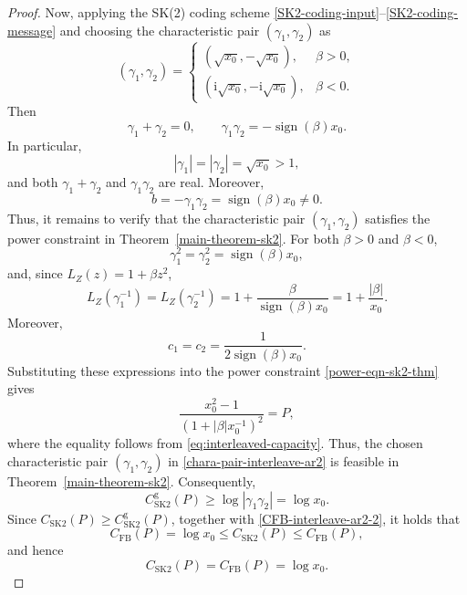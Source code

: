 \documentclass[12pt]{article}
\begin{document}
\begin{proof}
Now, applying the SK(2) coding scheme \eqref{SK2-coding-input}--\eqref{SK2-coding-message} and choosing the characteristic pair $(\gamma_1,\gamma_2)$ as
\begin{equation}\label{chara-pair-interleave-ar2}
(\gamma_1,\gamma_2) =
\begin{cases}
\left(\sqrt{x_0},-\sqrt{x_0}\right), & \beta>0,\\[1mm]
\left(\mathrm{i}\sqrt{x_0},-\mathrm{i}\sqrt{x_0}\right), & \beta<0.
\end{cases}
\end{equation}
Then
$$
\gamma_1+\gamma_2=0, \qquad \gamma_1\gamma_2=-\operatorname{sign}(\beta)x_0.
$$
In particular, 
$$
|\gamma_1|=|\gamma_2| = \sqrt{x_0}>1,
$$
and both $\gamma_1+\gamma_2$ and $\gamma_1\gamma_2$ are real. Moreover, 
$$
b = -\gamma_1\gamma_2=\operatorname{sign}(\beta)x_0\neq 0.
$$
Thus, it remains to verify that the characteristic pair $(\gamma_1,\gamma_2)$ satisfies the power constraint in Theorem~\ref{main-theorem-sk2}.
For both $\beta>0$ and $\beta<0$, 
$$
\gamma_1^2=\gamma_2^2=\operatorname{sign}(\beta) x_0,
$$
and, since $L_Z(z)=1+\beta z^2$,
$$
L_Z(\gamma_1^{-1})=L_Z(\gamma_2^{-1}) = 1 +\frac{\beta}{\operatorname{sign}(\beta) x_0}=1 +\frac{|\beta|}{ x_0}.
$$
Moreover,
$$
c_1=c_2=\frac{1}{2\operatorname{sign}(\beta) x_0}.
$$
Substituting these expressions into the power constraint \eqref{power-eqn-sk2-thm} gives
$$
\frac{x_0^2-1}{(1 +|\beta| x^{-1}_0)^2}=P,
$$
where the equality follows from \eqref{eq:interleaved-capacity}. Thus, the chosen characteristic pair $(\gamma_1,\gamma_2)$ in \eqref{chara-pair-interleave-ar2} is feasible in Theorem~\ref{main-theorem-sk2}. Consequently,
$$
C^\mathrm{g}_\mathrm{SK2}(P)\ge \log|\gamma_1\gamma_2|=\log x_0.
$$
Since $C_\mathrm{SK2}(P)\ge C^\mathrm{g}_\mathrm{SK2}(P)$, together with \eqref{CFB-interleave-ar2-2}, it holds that
$$
 C_{\mathrm{FB}}(P)=\log x_0 \le C_{\mathrm{SK2}}(P) \le C_{\mathrm{FB}}(P),
$$
and hence
\begin{equation}\label{CSK2-CFB-AR2-Inter}
C_\mathrm{SK2}(P)=C_\mathrm{FB}(P) = \log x_0.
\end{equation}


\end{proof}
\end{document}
